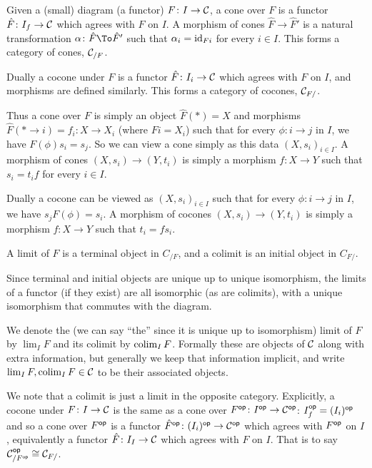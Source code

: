     Given a (small) diagram (a functor) $F\colon I\to{{\cal C}}$, a {\emphcolor cone} over $F$ is a functor $\hat F\colon I_f\to{{\cal C}}$ which agrees with $F$ on $I$.
    A morphism of cones $\hat F\to\hat F'$ is a natural transformation $\alpha\colon\hat F\To\hat F'$ such that $\alpha_i={\rm id}_{Fi}$ for every $i\in I$.
    This forms a category of cones, ${{\cal C}}_{/F}$.

    Dually a {\emphcolor cocone} under $F$ is a functor $\hat F\colon I_i\to{{\cal C}}$ which agrees with $F$ on $I$, and morphisms are defined similarly.
    This forms a category of cocones, ${{\cal C}}_{F/}$.

\edefn

Thus a cone over $F$ is simply an object $\hat F(*)=X$ and morphisms $\hat F(*\to i)=f_i\colon X\to X_i$ (where $Fi=X_i$) such that for every $\phi\colon i\to j$ in $I$, we have
$F(\phi)s_i=s_j$.
So we can view a cone simply as this data $(X,s_i)_{i\in I}$.
A morphism of cones $(X,s_i)\to(Y,t_i)$ is simply a morphism $f\colon X\to Y$ such that $s_i=t_if$ for every $i\in I$.

Dually a cocone can be viewed as $(X,s_i)_{i\in I}$ such that for every $\phi\colon i\to j$ in $I$, we have $s_jF(\phi)=s_i$.
A morphism of cocones $(X,s_i)\to(Y,t_i)$ is simply a morphism $f\colon X\to Y$ such that $t_i=fs_i$.

\bdefn

    A {\emphcolor limit} of $F$ is a terminal object in $C_{/F}$, and a {\emphcolor colimit} is an initial object in $C_{F/}$.

\edefn

Since terminal and initial objects are unique up to unique isomorphism, the limits of a functor (if they exist) are all isomorphic (as are colimits), with a unique
isomorphism that commutes with the diagram.

We denote the (we can say ``the'' since it is unique up to isomorphism) limit of $F$ by $\lim_IF$ and its colimit by $\mathop{\rm colim}\nolimits_IF$.
Formally these are objects of ${{\cal C}}$ along with extra information, but generally we keep that information implicit, and write $\mathop{\rm lim}\nolimits_IF,\mathop{\rm colim}\nolimits_IF\in{{\cal C}}$ to be their associated objects.

We note that a colimit is just a limit in the opposite category.
Explicitly, a cocone under $F\colon I\to{{\cal C}}$ is the same as a cone over $F^{\sf op}\colon I^{\sf op}\to{{\cal C}}^{\sf op}$: $I^{\sf op}_f=(I_i)^{\sf op}$ and so a cone over $F^{\sf op}$ is a functor
$\hat F^{\sf op}\colon(I_i)^{\sf op}\to{{\cal C}}^{\sf op}$ which agrees with $F^{\sf op}$ on $I$, equivalently a functor $\hat F\colon I_I\to{{\cal C}}$ which agrees with $F$ on $I$.
That is to say ${{\cal C}}^{\sf op}_{/F^{\sf op}}\cong{{\cal C}}_{F/}$.

